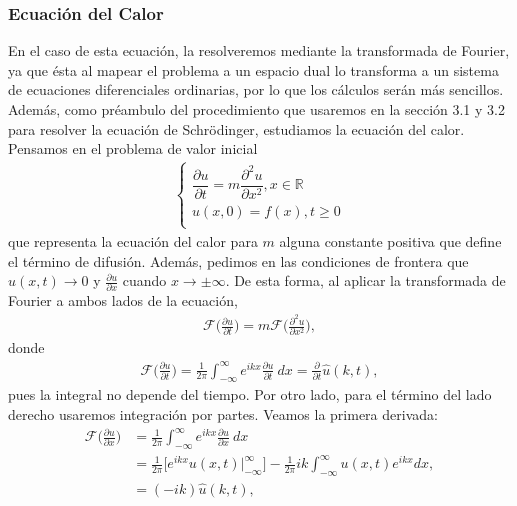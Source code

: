 \documentclass[12pt]{article}
\theoremstyle{definition}
\newcommand*{\field}[1]{\mathbb{#1}}
\begin{document}
\subsubsection{Ecuación del Calor}
\noindent
En el caso de esta ecuación, la resolveremos mediante la transformada de Fourier, ya que ésta al mapear el problema a un espacio dual lo transforma a un sistema de ecuaciones diferenciales ordinarias, por lo que los cálculos serán más sencillos. Además, como préambulo del procedimiento que usaremos en la sección 3.1 y 3.2 para resolver la ecuación de Schrödinger, estudiamos la ecuación del calor. Pensamos en el problema de valor inicial
\begin{align}
         \left\{ \begin{array}{ll}
         \dfrac{\partial u}{\partial t} = m\dfrac{\partial^2 u}{\partial x^2}, x\in\field{R}\\
         u(x,0) = f(x) , t\geq 0\\
         \end{array}
         \label{eq:EcCalor}
\right.
    \end{align}
que representa la ecuación del calor para $m$ alguna constante positiva que define el término de difusión. Además, pedimos en las condiciones de frontera que $u(x,t) \rightarrow 0$ y $\frac{\partial u}{\partial x}$ cuando $x \rightarrow \pm \infty$. De esta forma, al aplicar la transformada de Fourier a ambos lados de la ecuación,
\begin{align*}
    \mathcal{F}\bigg(\frac{\partial u}{\partial t} \bigg)=m\mathcal{F}\bigg(\frac{\partial^2 u}{\partial x^2}\bigg),
\end{align*}
donde
\begin{align*}
    \mathcal{F}\bigg(\frac{\partial u}{\partial t} \bigg) = \frac{1}{2\pi}\int_{-\infty}^{\infty}e^{ikx}\frac{\partial u}{\partial t}\:dx = \frac{\partial}{\partial t}\hat{u}(k,t),
\end{align*}
pues la integral no depende del tiempo. Por otro lado, para el término del lado derecho usaremos integración por partes. Veamos la primera derivada:
\begin{align*}
    \mathcal{F}\bigg(\frac{\partial u}{\partial x}\bigg) & = \frac{1}{2\pi}\int_{-\infty}^{\infty}e^{ikx}\frac{\partial u}{\partial x}\:dx
    \\
    & = \frac{1}{2\pi}\bigg[e^{ikx}u(x,t)\Big|_{-\infty}^{\infty}\bigg] - \frac{1}{2\pi}ik\int_{-\infty}^{\infty}u(x,t)e^{ikx}dx,
    \\
    & = (-ik)\hat{u}(k,t),
\end{align*}
\end{document}
